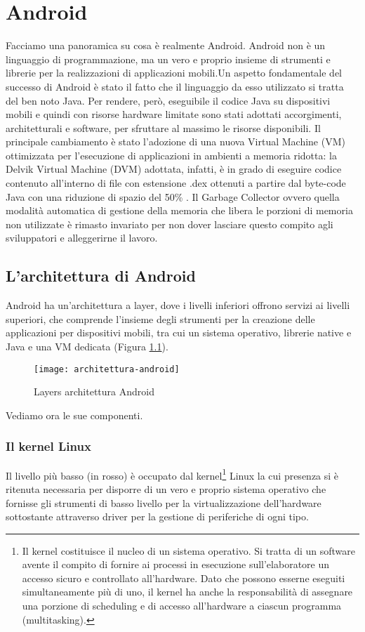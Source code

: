 \chapter{Android}
Facciamo una panoramica su cosa è realmente Android.
Android non è un linguaggio di programmazione, ma un vero e proprio insieme di strumenti e librerie per la realizzazioni di applicazioni mobili.Un aspetto fondamentale del successo di Android è stato il fatto che il linguaggio da esso utilizzato si tratta del ben noto Java. Per rendere, però, eseguibile il codice Java su dispositivi mobili e quindi con risorse hardware limitate sono stati adottati accorgimenti, architetturali e software, per sfruttare al massimo le risorse disponibili.
Il principale cambiamento è stato l'adozione di una nuova Virtual Machine (VM) ottimizzata per l'esecuzione di applicazioni in ambienti a memoria ridotta: la Delvik Virtual Machine (DVM) adottata, infatti, è in grado di eseguire codice contenuto all'interno di file con estensione .dex ottenuti a partire dal byte-code Java con una riduzione di spazio del 50\% . Il Garbage Collector ovvero quella modalità automatica di gestione della memoria che libera le porzioni di memoria non utilizzate è rimasto invariato per non dover lasciare questo compito agli sviluppatori e alleggerirne il lavoro.

\section{L'architettura di Android}
Android ha un'architettura a layer, dove i livelli inferiori offrono servizi ai livelli superiori, che comprende l'insieme degli strumenti per la creazione delle applicazioni per dispositivi mobili, tra cui un sistema operativo, librerie native e Java e una VM dedicata (Figura \ref{fig:architettura-android}).

\begin{figure}[!ht]
  \centering
    \texttt{[image: architettura-android]}
  \caption{Layers architettura Android}
  \label{fig:architettura-android}
\end{figure}
\FloatBarrier
Vediamo ora le sue componenti.

\subsection{Il kernel Linux}
Il livello più basso (in rosso) è occupato dal kernel\footnote{Il kernel costituisce il nucleo di un sistema operativo. Si tratta di un software avente il compito di fornire ai processi in esecuzione sull'elaboratore un accesso sicuro e controllato all'hardware. Dato che possono esserne eseguiti simultaneamente più di uno, il kernel ha anche la responsabilità di assegnare una porzione di scheduling e di accesso all'hardware a ciascun programma (multitasking).} Linux la cui presenza si è ritenuta necessaria per disporre di un vero e proprio sistema operativo che fornisse gli strumenti di basso livello per la virtualizzazione dell'hardware sottostante attraverso driver per la gestione di periferiche di ogni tipo.

